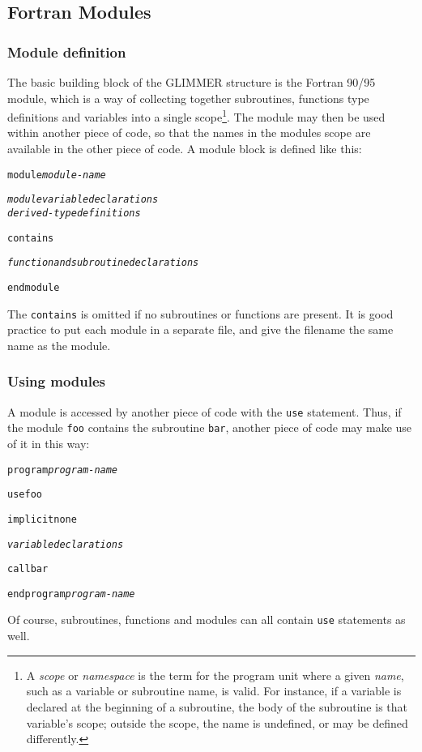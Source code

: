 \subsection{Fortran Modules}
%
\subsubsection{Module definition}
%
The basic building block of the GLIMMER structure is the Fortran 90/95 module,
which is a way of collecting together subroutines, functions type definitions
and variables into a single scope\footnote{A \emph{scope} or \emph{namespace}
 is the term for the program unit where a given \emph{name}, such as a variable
 or subroutine name, is valid. For instance, if a variable is declared at the
 beginning of a subroutine, the body of the subroutine is that variable's
 scope; outside the scope, the name is undefined, or may be defined
 differently.}. The module may then be used within another piece of code, so that the
names in the modules scope are available in the other piece of code. A module
block is defined like this:
%
\begin{alltt}
    module \textrm{\textit{module-name}}

        \textrm{\textit{module variable declarations}}
        \textrm{\textit{derived-type definitions}}

    contains

        \textrm{\textit{function and subroutine declarations}}

    end module
\end{alltt}
%
The \texttt{contains} is omitted if no subroutines or functions are
present. It is good practice to put each module in a separate file, and give
the filename the same name as the module.
%
\subsubsection{Using modules}
%
A module is accessed by another piece of code with the \texttt{use}
statement. Thus, if the module \texttt{foo} contains the subroutine
\texttt{bar}, another piece of code may make use of it in this way:
%
\begin{alltt}
    program \textrm{\textit{program-name}}

        use foo

        implicit none

        \textrm{\textit{variable declarations}}

        call bar

    end program \textrm{\textit{program-name}}
\end{alltt}
%
Of course, subroutines, functions and modules can all contain \texttt{use}
statements as well.
%

